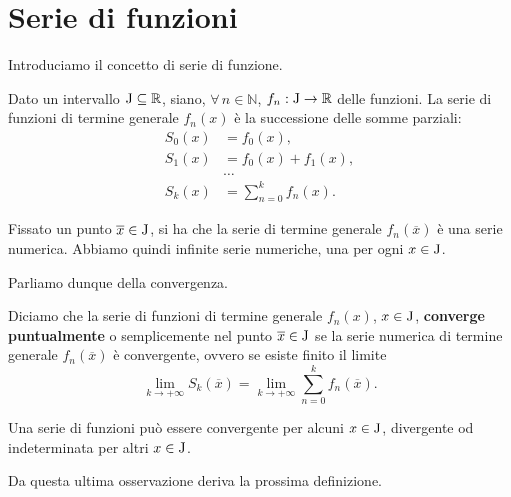 \documentclass[../../analisi2]{subfiles}
\begin{document}
    \chapter{Serie di funzioni}

        Introduciamo il concetto di serie di funzione.

        \begin{definizione}
            Dato un intervallo \(\mathrm{J} \subseteq \mathbb{R}\), siano, \(\forall \, n \in \mathbb{N}\), \(f_n : \mathrm{J} \to \mathbb{R}\) delle
            funzioni. La serie di funzioni di termine generale \(f_n(x)\) è la successione delle somme parziali:
            \begin{align*}
                S_0 (x) &= f_0 (x),\\
                S_1 (x) &= f_0 (x) + f_1 (x),\\
                &\dots\\
                S_k (x) &= \sum_{n = 0}^k f_n (x).
            \end{align*}
        \end{definizione}
        \begin{osservazione}
            Fissato un punto \(\overline{x} \in \mathrm{J}\), si ha che la serie di termine generale \(f_n (\overline{x})\) è una serie
            numerica. Abbiamo quindi infinite serie numeriche, una per ogni \(x \in \mathrm{J}\).
        \end{osservazione}

        Parliamo dunque della convergenza.
        
        \begin{definizione}
            Diciamo che la serie di funzioni di termine generale \(f_n (x)\), \(x \in \mathrm{J}\), \textbf{converge puntualmente} o
            semplicemente nel punto \(\overline{x} \in \mathrm{J}\) se la serie numerica di termine generale \(f_n (\overline{x})\) è
            convergente, ovvero se esiste finito il limite
            \[
                \lim_{k \to +\infty} S_k(\overline{x}) = \lim_{k \to +\infty} \sum_{n = 0}^k f_n (\overline{x}).
            \]
        \end{definizione}
        \begin{osservazione}
            Una serie di funzioni può essere convergente per alcuni \(x \in \mathrm{J}\), divergente od indeterminata per altri
            \(x \in \mathrm{J}\).
        \end{osservazione}

        Da questa ultima osservazione deriva la prossima definizione.
        
\end{document}
